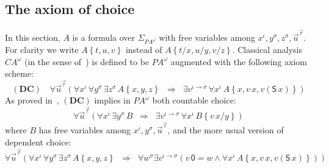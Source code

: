 \documentclass{CSML}
\newcommand*\SortTo\to
\newcommand*\SortA{\sigma}
\newcommand*\SortB{\tau}
\newcommand*\LogSortedTerm[2]{#1^{#2}}
\newcommand*\LogTermA{t}
\newcommand*\LogTermB{u}
\newcommand*\LogTermC{v}
\newcommand*\LogVarA{x}
\newcommand*\LogVarB{y}
\newcommand*\LogVarC{z}
\newcommand*\LogVarD{u}
\newcommand*\LogVarE{v}
\newcommand*\LogVarF{w}
\newcommand*\LogConst[1]{\mathsf{#1}}
\newcommand*\LogImp{\mathbin{\Rightarrow}}
\newcommand*\LogAnd{\mathbin{\wedge}}
\newcommand*\LogFormA{A}
\newcommand*\LogFormB{B}
\newcommand*\LogSubst[1]{\left\{#1\right\}}
\newcommand*\PA{{P\!A}}
\newcommand*\PAom{{\PA^\omega}}
\newcommand*\CA{{C\!A}}
\newcommand*\CAom{{\CA^\omega}}
\newcommand*\CASort\iota
\newcommand*\CALogZ{\LogConst{0}}
\newcommand*\CALogS{\LogConst{S}}
\newcommand*\CAAxName[1]{{\bm{\scriptstyle(#1)}}}
\newcommand*\CADCUnrelName{\CAAxName{DC}}
\newcommand*\CADCUnrel[3]{\forall\LogSortedTerm{\vec{\LogVarD}}{\vec{#3}}\left(\forall\LogSortedTerm{\LogVarA}{\CASort}\,\forall\LogSortedTerm{\LogVarB}{#1}\,\exists\LogSortedTerm{\LogVarC}{#1}\,#2\LogSubst{\LogVarA,\LogVarB,\LogVarC}\;\;\LogImp\;\;\exists\LogSortedTerm{\LogVarE}{\CASort\SortTo#1}\,\forall\LogSortedTerm{\LogVarA}{\CASort}\,#2\LogSubst{\LogVarA,\LogVarE\,\LogVarA,\LogVarE\left(\CALogS\,\LogVarA\right)}\right)}
\begin{document}
\subsection{The axiom of choice}
In this section, $\LogFormA$ is a formula over $\Sigma_\PAom$ with free variables among $\LogSortedTerm{\LogVarA}{\CASort},\LogSortedTerm{\LogVarB}{\SortA},\LogSortedTerm{\LogVarC}{\SortA},\LogSortedTerm{\vec{\LogVarD}}{\vec{\SortB}}$. For clarity we write $\LogFormA\LogSubst{\LogTermA,\LogTermB,\LogTermC}$ instead of $\LogFormA\LogSubst{\LogTermA/\LogVarA,\LogTermB/\LogVarB,\LogTermC/\LogVarC}$. Classical analysis $\CAom$ (in the sense of~\cite{KohlenbachProofTheory}) is defined to be $\PAom$ augmented with the following axiom scheme:
$$\CADCUnrelName\quad\CADCUnrel{\SortA}{\LogFormA}{\SortB}$$
As proved in~\cite{KohlenbachProofTheory}, $\CADCUnrelName$ implies in $\PAom$ both countable choice:
$$\forall\LogSortedTerm{\vec{\LogVarD}}{\vec{\SortB}}\left(\forall\LogSortedTerm{\LogVarA}{\CASort}\,\exists\LogSortedTerm{\LogVarB}{\SortA}\,\LogFormB\;\;\LogImp\;\;\exists\LogSortedTerm{\LogVarE}{\CASort\SortTo\SortA}\,\forall\LogSortedTerm{\LogVarA}{\CASort}\,\LogFormB\LogSubst{\LogVarE\,\LogVarA/\LogVarB}\right)$$
where $\LogFormB$ has free variables among $\LogSortedTerm{\LogVarA}{\CASort},\LogSortedTerm{\LogVarB}{\SortA},\LogSortedTerm{\vec{\LogVarD}}{\vec{\SortB}}$, and the more usual version of dependent choice:
$$\forall\LogSortedTerm{\vec{\LogVarD}}{\vec{\SortB}}\left(\forall\LogSortedTerm{\LogVarA}{\CASort}\,\forall\LogSortedTerm{\LogVarB}{\SortA}\,\exists\LogSortedTerm{\LogVarC}{\SortA}\,\LogFormA\LogSubst{\LogVarA,\LogVarB,\LogVarC}\;\;\LogImp\;\;\forall\LogSortedTerm{\LogVarF}{\SortA}\exists\LogSortedTerm{\LogVarE}{\CASort\SortTo\SortA}\left(\LogVarE\,\CALogZ=\LogVarF\LogAnd\forall\LogSortedTerm{\LogVarA}{\CASort}\,\LogFormA\LogSubst{\LogVarA,\LogVarE\,\LogVarA,\LogVarE\left(\CALogS\,\LogVarA\right)}\right)\right)$$
\end{document}
